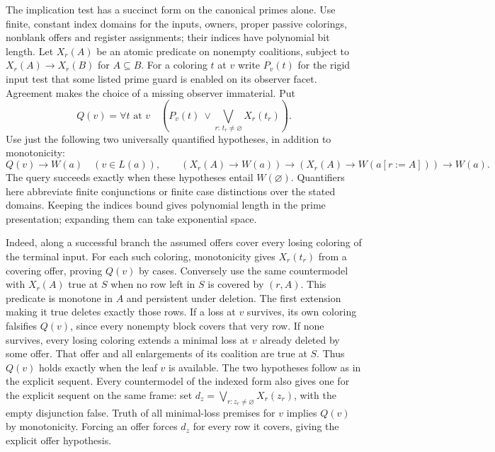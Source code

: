 The implication test has a succinct form on the canonical primes
alone. Use finite, constant index domains for the inputs, owners,
proper passive colorings, nonblank offers and register assignments;
their indices have polynomial bit length. Let $X_r(A)$ be an atomic
predicate on nonempty coalitions, subject to
$X_r(A)\to X_r(B)$ for $A\subseteq B$.
For a coloring $t$ at $v$ write $P_v(t)$ for the rigid input test
that some listed prime guard is enabled on its observer facet.
Agreement makes the choice of a missing observer immaterial. Put
\[
 Q(v)=\forall t\text{ at }v\quad
 \left(P_v(t)\ \lor\!
       \bigvee_{r:\,t_r\ne\varnothing} X_r(t_r)\right).
\]
Use just the following two universally quantified hypotheses, in
addition to monotonicity:
\[
  Q(v)\to W(a)\quad(v\in L(a)),\qquad
  (X_r(A)\to W(a))\to(X_r(A)\to W(a[r:=A]))\to W(a).
\]
The query succeeds exactly when these hypotheses entail
$W(\varnothing)$. Quantifiers here abbreviate finite conjunctions or
finite case distinctions over the stated domains. Keeping the indices
bound gives polynomial length in the prime presentation; expanding
them can take exponential space.

Indeed, along a successful branch the assumed offers cover every
losing coloring of the terminal input. For each such coloring,
monotonicity gives $X_r(t_r)$ from a covering offer, proving $Q(v)$
by cases. Conversely use the same countermodel with $X_r(A)$ true
at $S$ when no row left in $S$ is covered by $(r,A)$. This predicate
is monotone in $A$ and persistent under deletion. The first extension
making it true deletes exactly those rows. If a loss at $v$ survives,
its own coloring falsifies $Q(v)$, since every nonempty block covers
that very row. If none survives, every losing coloring extends a
minimal loss at $v$ already deleted by some offer. That offer and
all enlargements of its coalition are true at $S$. Thus $Q(v)$
holds exactly when the leaf $v$ is available. The two hypotheses
follow as in the explicit sequent. Every countermodel of the indexed
form also gives one for the explicit sequent on the same frame: set
$d_z=\bigvee_{r:z_r\ne\varnothing}X_r(z_r)$, with the empty
disjunction false. Truth of all minimal-loss premises for $v$ implies
$Q(v)$ by monotonicity. Forcing an offer forces $d_z$ for every row
it covers, giving the explicit offer hypothesis.

